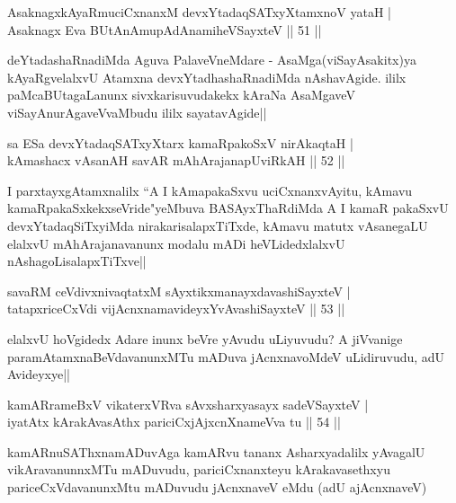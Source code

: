 \begin{shl}
AsaknagxkAyaRmuciCxnanxM devxYtadaqSATxyX\s \s tamxnoV yataH |\\
Asaknagx Eva BUtAnAmupAdAnamiheVSayxteV \hfill || 51 ||
\end{shl}

\begin{artha}
deYtadashaRnadiMda Aguva PalaveVneMdare - AsaMga(viSayAsakitx)ya kAyaRgvelalxvU Atamxna  devxYtadhashaRnadiMda nAshavAgide. ililx paMcaBUtagaLanunx sivxkarisuvudakekx kAraNa AsaMgaveV viSayAnurAgaveVvaMbudu ililx sayatavAgide||
\end{artha}

\begin{shl}
sa ESa devxYtadaqSATxyX\s tarx kamaRpakoSxV nirAkaqtaH |\\
kAmashacx vAsanAH savAR mAhArajanapUviRkAH \hfill || 52 ||
\end{shl}

\begin{artha}
I parxtayxgAtamxnalilx ``A I kAmapakaSxvu uciCxnanxvAyitu, kAmavu kamaRpakaSxkekxseVride"yeMbuva BASAyxThaRdiMda A I kamaR pakaSxvU devxYtadaqSiTxyiMda nirakarisalapxTiTxde, kAmavu matutx vAsanegaLU elalxvU mAhArajanavanunx modalu mADi heVLidedxlalxvU nAshagoLisalapxTiTxve||
\end{artha}

\begin{shl}
savaRM ceVdivxnivaqtatxM sAyxtikxmanayxdavashiSayxteV |\\
tatapxriceCxVdi vijAcnxnamavideyxYvAvashiSayxteV \hfill || 53 ||
\end{shl}

\begin{artha}
elalxvU hoVgidedx Adare inunx beVre yAvudu uLiyuvudu? A jiVvanige paramAtamxnaBeVdavanunxMTu  mADuva jAcnxnavoMdeV uLidiruvudu, adU Avideyxye||
\end{artha}

\begin{shl}
kamAR\s \s rameBxV vikaterxVRva sAvxsharxyasayx sadeVSayxteV |\\
iyatAtx kArakAvasAthx pariciCxjAjxcnXnameVva tu \hfill || 54 ||
\end{shl}

\begin{artha}
kamARnuSAThxnamADuvAga kamARvu tananx Asharxyadalilx yAvagalU vikAravanunnxMTu mADuvudu, pariciCxnanxteyu kArakavasethxyu pariceCxVdavanunxMtu mADuvudu jAcnxnaveV eMdu (adU ajAcnxnaveV)
\end{artha}

